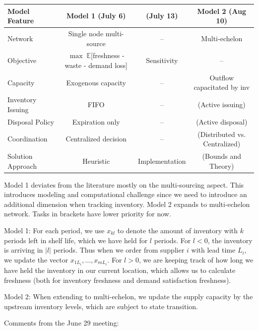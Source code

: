 \documentclass{article}
\newcommand{\ra}[1]{
\renewcommand{\arraystretch}{#1}}
\begin{document}
\begin{table}[h!]
\small
\centering
\ra{1.3}
\begin{tabular}{@{}lccc@{}}
\toprule
Model Feature & Model 1 (July 6) & (July 13) & Model 2 (Aug 10) \\
\midrule
Network & Single node multi-source & -- & Multi-echelon \\
Objective & $\max \; \mathbb{E}$[freshness - waste - demand loss] & Sensitivity & -- \\
Capacity & Exogenous capacity & -- & Outflow capacitated by inv \\
Inventory Issuing & FIFO & -- & (Active issuing) \\
Disposal Policy & Expiration only & -- & (Active disposal) \\
Coordination & Centralized decision & -- & (Distributed vs. Centralized) \\
Solution Approach & Heuristic & Implementation & (Bounds and Theory) \\
\bottomrule
\end{tabular}
\end{table}

Model 1 deviates from the literature mostly on the multi-sourcing aspect. This introduces modeling and computational challenge since we need to introduce an additional dimension when tracking inventory. Model 2 expands to multi-echelon network. Tasks in brackets have lower priority for now.

Model 1: For each period, we use $x_{kl}$ to denote the amount of inventory with $k$ periods left in shelf life, which we have held for $l$ periods. For $l < 0$, the inventory is arriving in $|l|$ periods. Thus when we order from supplier $i$ with lead time $L_i$, we update the vector $x_{1L_i},\dots,x_{mL_i}$. For $l > 0$, we are keeping track of how long we have held the inventory in our current location, which allows us to calculate freshness (both for inventory freshness and demand satisfaction freshness). 

Model 2: When extending to multi-echelon, we update the supply capacity by the upstream inventory levels, which are subject to state transition.
\newline

Comments from the June 29 meeting:
\end{document}
